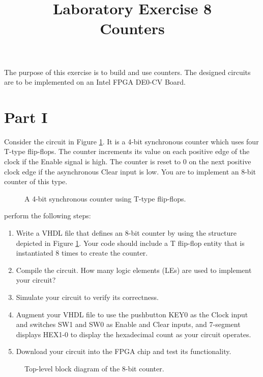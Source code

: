 \documentclass{article}
\title{Laboratory Exercise 8 \\ Counters}
\author{}
\date{}
\begin{document}
\maketitle

The purpose of this exercise is to build and use counters. The designed circuits are to be implemented on an Intel FPGA DE0-CV Board.

\section*{Part I}

Consider the circuit in Figure \ref{fig:counter_struct}. It is a 4-bit synchronous counter which uses four T-type flip-flops. The counter increments its value on each positive edge of the clock if the Enable signal is high. The counter is reset to 0 on the next positive clock edge if the asynchronous Clear input is low. You are to implement an 8-bit counter of this type.

\begin{figure}[H]
    \centering
    \resizebox{0.7\textwidth}{!}{}
    \caption{A 4-bit synchronous counter using T-type flip-flops.}
    \label{fig:counter_struct}
\end{figure}

perform the following steps:
\begin{enumerate}
    \item Write a VHDL file that defines an 8-bit counter by using the structure depicted in Figure \ref{fig:counter_struct}. Your code should include a T flip-flop entity that is instantiated 8 times to create the counter.
    \item Compile the circuit. How many logic elements (LEs) are used to implement your circuit?
    \item Simulate your circuit to verify its correctness.
    \item Augment your VHDL file to use the pushbutton KEY0 as the Clock input and switches SW1 and SW0 as Enable and Clear inputs, and 7-segment displays HEX1-0 to display the hexadecimal count as your circuit operates.
    \item Download your circuit into the FPGA chip and test its functionality.
\end{enumerate}

\begin{figure}[H]
    \centering
    \resizebox{0.7\textwidth}{!}{}
    \caption{Top-level block diagram of the 8-bit counter.}
    \label{fig:part1_top_level}
\end{figure}
\end{document}
